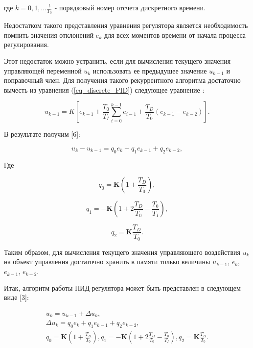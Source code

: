 где $k = 0, 1, \ldots\frac{t}{T_0}$ - порядковый номер отсчета дискретного времени.

Недостатком такого представления уравнения регулятора является необходимость помнить значения отклонений $e_k$ для всех моментов времени от начала процесса регулирования.

Этот недостаток можно устранить, если для вычисления текущего значения управляющей переменной $u_k$ использовать ее предыдущее значение $u_{k - 1}$ и поправочный член. Для получения такого рекуррентного алгоритма достаточно вычесть из уравнения (\ref{eq_discrete_PID}) следующее уравнение \cite{PID_NIL_AP}:

\begin{equation}
        u_{k - 1} = K \left[e_{k - 1} + \frac{T_0}{T_I} \sum_{i=0}^{k-1}{e_{i - 1}}+\frac{T_D}{T_0}(e_{k - 1} - e_{k - 2})\right].
\end{equation}

В результате получим [6]:

\begin{equation}
    u_k - u_{k - 1} = q_0 e_k + q_1 e_{k - 1} + q_2 e_{k - 2},
\end{equation}

Где

\begin{equation}
    q_0=\mathbf{K}\left(1+\frac{T_D}{T_0}\right),
\end{equation}

\begin{equation}
    q_1=-\mathbf{K}\left(1+2\frac{T_D}{T_0}-\frac{T_0}{T_I}\right),
\end{equation}

\begin{equation}
    q_2=\mathbf{K}\frac{T_D}{T_0}.
\end{equation}

Таким образом, для вычисления текущего значения управляющего воздействия $u_k$ на объект управления достаточно хранить в памяти только величины $u_{k - 1}$, $e_k$, $e_{k - 1}$, $e_{k - 2}$.

Итак, алгоритм работы ПИД-регулятора может быть представлен в следующем виде [3]:

\begin{equation}\label{PID_algorithm}
    \begin{gathered}
    u_k = u_{k - 1} + \Delta u_k, \\
    \Delta u_k = q_0 e_k + q_1 e_{k - 1} + q_2 e_{k - 2}, \\
    q_0 = \mathbf{K}\left(1 + \frac{T_D}{T_0}\right), q_1 = -\mathbf{K}\left(1 + 2\frac{T_D}{T_0} - \frac{T_0}{T_I}\right), q_2 = \mathbf{K}\frac{T_D}{T_0}.
    \end{gathered}
\end{equation}

